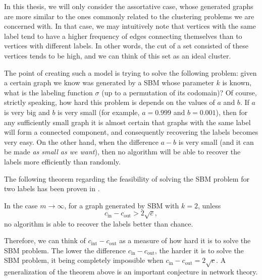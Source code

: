 In this thesis, we will only consider the assortative case, whose generated graphs are more similar to the ones commonly related to the clustering problems we are concerned with.
In that case, we may intuitively note that vertices with the same label tend to have a higher frequency of edges connecting themselves than to vertices with different labels.
In other words, the cut of a set consisted of these vertices tends to be high, and we can think of this set as an ideal cluster.

The point of creating such a model is trying to solve the following problem: given a certain graph we know was generated by a SBM whose parameter $k$ is known, what is the labeling function $\sigma$ (up to a permutation of its codomain)?
Of course, strictly speaking, how hard this problem is depends on the values of $a$ and $b$. 
If $a$ is very big and $b$ is very small (for example, $a = 0.999$ and $b = 0.001$), then for any sufficiently small graph it is almost certain that graphs with the same label will form a connected component, and consequently recovering the labels becomes very easy.
On the other hand, when the difference $a-b$ is very small (and it can be made \textit{as small as we want}), then no algorithm will be able to recover the labels more efficiently than randomly.

The following theorem regarding the feasibility of solving the SBM problem for two labels has been proven in \cite{ramanujan}. 

\begin{theorem}
In the case $m \rightarrow \infty$, for a graph generated by SBM with $k = 2$, unless
   \begin{equation}
      c_\text{in} - c_\text{out} > 2 \sqrt{c},
   \end{equation}
   no algorithm is able to recover the labels better than chance.
\end{theorem}

Therefore, we can think of $c_\text{int} - c_\text{out}$ as a measure of how hard it is to solve the SBM problem.
The lower the difference $c_\text{in} - c_\text{out}$, the harder it is to solve the SBM problem, it being completely impossible when $c_\text{in} - c_\text{out} = 2 \sqrt{c}$.
A generalization of the theorem above is an important conjecture in network theory.

